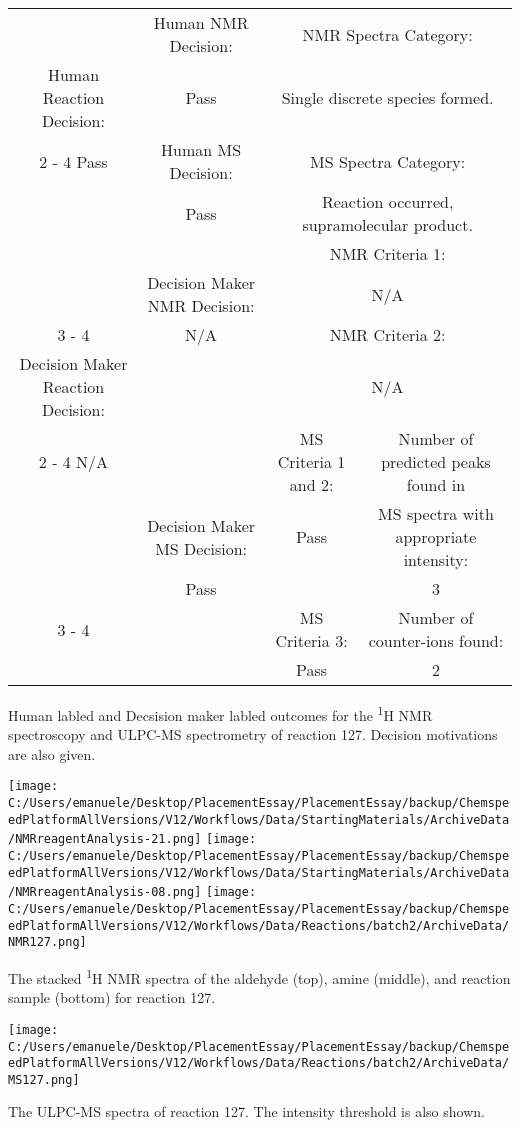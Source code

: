 \documentclass{article}%
\begin{document}
\begin{Decision Table}[H]%
\begin{tabular}{|c|c|c|c|}%
\hline%
&Human NMR Decision:&\multicolumn{2}{|c|}{NMR Spectra Category:}\\%
Human Reaction Decision:&Pass&\multicolumn{2}{|c|}{Single discrete species formed.}\\%
\cline{2%
-%
4}%
Pass&Human MS Decision:&\multicolumn{2}{|c|}{MS Spectra Category:}\\%
&Pass&\multicolumn{2}{|c|}{Reaction occurred, supramolecular product.}\\%
\hline%
&&\multicolumn{2}{|c|}{NMR Criteria 1:}\\%
&Decision Maker NMR Decision:&\multicolumn{2}{|c|}{N/A}\\%
\cline{3%
-%
4}%
&N/A&\multicolumn{2}{|c|}{NMR Criteria 2:}\\%
Decision Maker Reaction Decision:&&\multicolumn{2}{|c|}{N/A}\\%
\cline{2%
-%
4}%
N/A&&MS Criteria 1 and 2:&Number of predicted peaks found in\\%
&Decision Maker MS Decision:&Pass&MS spectra with appropriate intensity:\\%
&Pass&&3\\%
\cline{3%
-%
4}%
&&MS Criteria 3:&Number of counter{-}ions found:\\%
&&Pass&2\\%
\hline%
\end{tabular}%
\caption{Human labled and Decsision maker labled outcomes for the \textsuperscript{1}H NMR spectroscopy and ULPC-MS spectrometry of reaction 127. Decision motivations are also given.}%
\end{Decision Table}%
\begin{NMR Spectra}[H]%
\begin{center}%
\texttt{[image: C:/Users/emanuele/Desktop/PlacementEssay/PlacementEssay/backup/ChemspeedPlatformAllVersions/V12/Workflows/Data/StartingMaterials/ArchiveData/NMRreagentAnalysis-21.png]}\hfill%
\texttt{[image: C:/Users/emanuele/Desktop/PlacementEssay/PlacementEssay/backup/ChemspeedPlatformAllVersions/V12/Workflows/Data/StartingMaterials/ArchiveData/NMRreagentAnalysis-08.png]}\hfill%
\texttt{[image: C:/Users/emanuele/Desktop/PlacementEssay/PlacementEssay/backup/ChemspeedPlatformAllVersions/V12/Workflows/Data/Reactions/batch2/ArchiveData/NMR127.png]}\hfill%
\end{center}%
\caption{The stacked \textsuperscript{1}H NMR spectra of the aldehyde (top), amine (middle), and reaction sample (bottom) for reaction 127.}%
\end{NMR Spectra}%
\begin{MS Spectra}[H]%
\begin{center}%
\texttt{[image: C:/Users/emanuele/Desktop/PlacementEssay/PlacementEssay/backup/ChemspeedPlatformAllVersions/V12/Workflows/Data/Reactions/batch2/ArchiveData/MS127.png]}\hfill%
\end{center}%
\caption{The ULPC-MS spectra of reaction 127. The intensity threshold is also shown.}%
\end{MS Spectra}%
\end{document}
